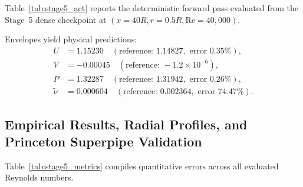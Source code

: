 \documentclass[11pt,a4paper]{article}
\begin{document}
Table~\ref{tab:stage5_act} reports the deterministic forward pass evaluated from the Stage~5 dense checkpoint at $(x=40R, r=0.5R, \mathrm{Re}=40{,}000)$.
\begin{table}[H]
\centering
{}
\caption{Deterministic layer-by-layer forward pass evaluated at $(x=40R, r=0.5R, \mathrm{Re}=40{,}000)$. Normalized input vector: $[0.0000, 0.0000, 0.8010, 0.3335]^{\mathsf T}$. Checkpoint SHA256: \texttt{82a6cf755909e86e...}.}
\label{tab:stage5_act}
\end{table}
Envelopes yield physical predictions:
\begin{align}
U &= \mathbf{1.15230} \quad (\text{reference: } 1.14827, \text{ error } 0.35\%), \\
V &= -0.00045 \quad (\text{reference: } -1.2\times 10^{-6}), \\
P &= \mathbf{1.32287} \quad (\text{reference: } 1.31942, \text{ error } 0.26\%), \\
\tilde{\nu} &= \mathbf{0.000604} \quad (\text{reference: } 0.002364, \text{ error } \mathbf{74.47\%}).
\end{align}

\subsection{Empirical Results, Radial Profiles, and Princeton Superpipe Validation}
Table~\ref{tab:stage5_metrics} compiles quantitative errors across all evaluated Reynolds numbers.

\end{document}
